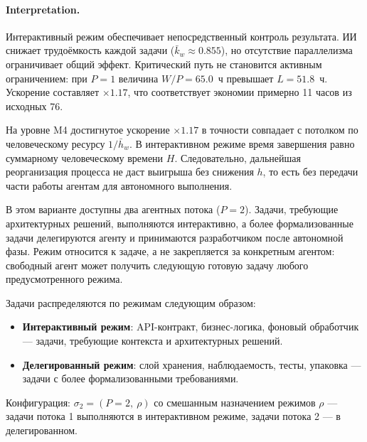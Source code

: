 \documentclass[12pt,a4paper]{article}
\theoremstyle{definition}
\begin{document}
\paragraph{Interpretation.}
Интерактивный режим обеспечивает непосредственный контроль результата. ИИ снижает трудоёмкость каждой задачи ($\bar{k}_w \approx 0.855$), но отсутствие параллелизма ограничивает общий эффект. Критический путь не становится активным ограничением: при $P=1$ величина $W/P=65.0$~ч превышает $L=51.8$~ч. Ускорение составляет $\times 1.17$, что соответствует экономии примерно 11 часов из исходных 76.

На уровне M4 достигнутое ускорение $\times 1.17$ в точности совпадает с потолком по человеческому ресурсу $1/\bar{h}_w$. В интерактивном режиме время завершения равно суммарному человеческому времени $H$. Следовательно, дальнейшая реорганизация процесса не даст выигрыша без снижения $h$, то есть без передачи части работы агентам для автономного выполнения.


В этом варианте доступны два агентных потока ($P = 2$). Задачи, требующие архитектурных решений, выполняются интерактивно, а более формализованные задачи делегируются агенту и принимаются разработчиком после автономной фазы. Режим относится к задаче, а не закрепляется за конкретным агентом: свободный агент может получить следующую готовую задачу любого предусмотренного режима.

Задачи распределяются по режимам следующим образом:
\begin{itemize}
  \item \textbf{Интерактивный режим}: API-контракт, бизнес-логика, фоновый обработчик --- задачи, требующие контекста и архитектурных решений.
  \item \textbf{Делегированный режим}: слой хранения, наблюдаемость, тесты, упаковка --- задачи с более формализованными требованиями.
\end{itemize}

Конфигурация: $\sigma_2 = (P{=}2,\ \rho)$ со смешанным назначением режимов $\rho$ --- задачи потока 1 выполняются в интерактивном режиме, задачи потока 2 --- в делегированном.
\end{document}
